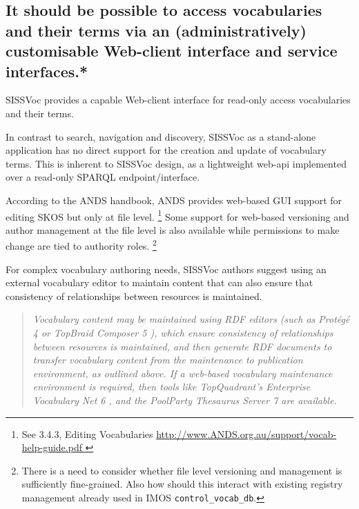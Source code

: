 \documentclass[10pt,a4paper]{article}
\newenvironment{italicquotes}
{\begin{quote}\itshape}
{\end{quote}}
\begin{document}
\begin{flushleft}
  \subsection{
  It should be possible to access vocabularies and their terms via an 
  (administratively) customisable Web-client interface and service interfaces.* } 

   \item  SISSVoc provides a capable Web-client interface for read-only access
  vocabularies and their terms.

   \item  In contrast to search, navigation and discovery, SISSVoc as a stand-alone
  application has no direct support for the creation and update of vocabulary
  terms. This is inherent to SISSVoc design, as a lightweight web-api implemented
  over a read-only SPARQL endpoint/interface.  

 \item    According to the ANDS handbook, ANDS provides web-based GUI support for
  editing SKOS but only at file level.  \footnote { See 3.4.3, Editing
  Vocabularies \url{ http://www.ANDS.org.au/support/vocab-help-guide.pdf } } Some 
  support for web-based versioning and author management at the file level
  is also available while permissions to make change are tied to authority 
  roles.  \footnote { There is a need to consider whether file level versioning and
  management is sufficiently fine-grained. Also how should this interact with
  existing registry management already used in IMOS \texttt{control\_vocab\_db}.
  }
    
 \item    For complex vocabulary authoring needs, SISSVoc authors suggest using an
  external vocabulary editor to maintain content that can also ensure that
  consistency of relationships between resources is maintained. 

    \begin{italicquotes} Vocabulary content may be maintained using RDF editors
  (such as Protégé 4 or TopBraid Composer 5 ), which ensure consistency of
  relationships between resources is maintained, and then generate RDF documents
  to transfer vocabulary content from the maintenance to publication environment, 
  as outlined above. If a web-based vocabulary maintenance environment
  is required, then tools like TopQuadrant’s Enterprise Vocabulary Net 6 , and
  the PoolParty Thesaurus Server 7 are available.  \end{italicquotes} 


\end{flushleft}
\end{document}
